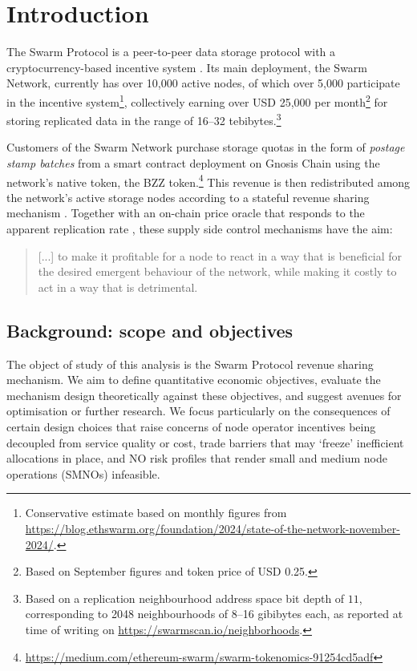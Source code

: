\maketitlepage
\section{Introduction}

The Swarm Protocol is a peer-to-peer data storage protocol with a cryptocurrency-based incentive system \cite{book-of-swarm}.
%
Its main deployment, the Swarm Network, currently has over 10,000 active nodes, of which over 5,000 participate in the incentive system\footnote{Conservative estimate based on monthly figures from \url{https://blog.ethswarm.org/foundation/2024/state-of-the-network-november-2024/}.}, collectively earning over USD 25,000 per month\footnote{Based on September figures and token price of USD 0.25.} for storing replicated data in the range of 16--32 tebibytes.\footnote{Based on a replication neighbourhood address space bit depth of $11$, corresponding to 2048 neighbourhoods of 8--16 gibibytes each, as reported at time of writing on \url{https://swarmscan.io/neighborhoods}.}

Customers of the Swarm Network purchase storage quotas in the form of \emph{postage stamp batches} \cite[\S3.3]{book-of-swarm} from a smart contract deployment on Gnosis Chain using the network's native token, the BZZ token.\footnote{\url{https://medium.com/ethereum-swarm/swarm-tokenomics-91254cd5adf}}
%
This revenue is then redistributed among the network's active storage nodes according to a stateful revenue sharing mechanism \cite[\S3.4]{book-of-swarm}.
%
Together with an on-chain price oracle that responds to the apparent replication rate \cite[\S3.4.5]{book-of-swarm}, these supply side control mechanisms have the aim:
%
\begin{quote}
%
  [...] to make it profitable for a node to react in a way that is beneficial for the desired emergent behaviour of the network, while making it costly to act in a way that is detrimental. \hfill\cite[79]{book-of-swarm}
%
\end{quote}


\subsection{Background: scope and objectives}

The object of study of this analysis is the Swarm Protocol revenue sharing mechanism. 
%
We aim to define quantitative economic objectives, evaluate the mechanism design theoretically against these objectives, and suggest avenues for optimisation or further research.
%
We focus particularly on the consequences of certain design choices that raise concerns of node operator incentives being decoupled from service quality or cost, trade barriers that may `freeze' inefficient allocations in place, and NO risk profiles that render small and medium node operations (SMNOs) infeasible.


